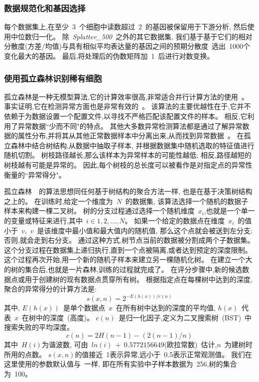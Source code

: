 \subsubsection{数据规范化和基因选择}
\label{subsec:datapreprocessing} 
每个数据集上,在至少~3~个细胞中读数超过~2~的基因被保留用于下游分析,
然后使用中位数归一化。
除~\textit{Splatter\_500}~之外的其它数据集,
我们基于基于它们的相对分散度(方差/均值)与具有相似平均表达量的基因之间的预期分散度~\cite{zheng2017massively,macosko2015highly}选出~1000个变化最大的基因。
最后,将处理后的伪数矩阵加~1~后进行对数变换。

\subsubsection{使用孤立森林识别稀有细胞}
\label{subsec:if} 

孤立森林是一种无模型算法,它的计算效率很高,非常适合并行计算方法的使用~\cite{hariri2018batch}。
事实证明,它在检测异常方面也是非常有效的~\cite{susto2017anomaly}。
该算法的主要优越性在于,它并不依赖于为数据设置一个配置文件,以寻找不严格匹配该配置文件的样本。
相反,它利用了异常数据``少而不同"的特点。
其他大多数异常检测算法都是通过了解异常数据的属性分布,并将其从其他正常数据样本中分离出来,从而找到异常数据~\cite{noto2010anomaly,chen2011ordinal,das2016incorporating}。
在孤立森林中结合树结构,从数据中抽取子样本,
并根据数据集中随机选取的特征值进行随机切割。
树枝路径越长,那么该样本为异常样本的可能性越低;
相反,路径越短的树枝越有可能是异常的。
因此,每个树枝的总长度可以被看作是对指定点的异常性衡量的``异常得分"。

孤立森林~\cite{liu2008isolation,liu2012isolation}~的算法思想同任何基于树结构的聚合方法一样,
也是在基于决策树结构之上的。
在训练时,给定一个维度为~$N$~的数据集,
该算法选择一个随机的数据子样本来构建一棵二叉树。
树的分支过程通过选择一个随机维度~$x_i$,也就是一个单一的变量或特征来进行,其中~$i \in {1,2,\ldots,N}$。
如果一个给定的数据点在维度~$x_i$~的值小于~$v$,~$v$~是该维度中最小值和最大值内的随机值,
那么这个点就会被送到左分支;否则,就会走到右分支。
通过这种方式,树节点当前的数据被分割成两个子数据集。
这个分支过程在数据集上递归执行,直到一个点被隔离,或者达到预定的深度限制。
这个过程再次开始,用一个新的随机子样本来建立另一棵随机化树。
在建立一个大的树的集合后,也就是一片森林,训练的过程就完成了。
在评分步骤中,新的候选数据点或用于创建树的现有数据点贯穿所有树。
根据指定点在每棵树中达到的深度,聚合的异常得分的计算方法是:
\begin{equation}
    \label{as}
    s(x,n) = 2^{-E(h(x))/c(n)}
\end{equation}
其中, $E(h(x))$~是单个数据点~$x$~在所有树中达到的深度的平均值, $h(x)$~代表~$x$~在树中的深度~(高度)。 
$c(n)$~是归一化因子,定义为二叉搜索树~(BST)~中搜索失败的平均深度。
\begin{equation}
    \label{lab:as}
    c(n) = 2H(n - 1) - (2(n - 1)/n)
\end{equation}
其中~$H(i)$为谐波数,
可由~$ln(i)~+~0.5772156649$(欧拉常数)~\cite{liu2012isolation}估计,$n$~为建树时所用的点数。
$s(x,n)$的值接近~1表示异常,远小于~0.5表示正常观测值。
我们在这里使用的参数默认值与~\cite{liu2008isolation,liu2012isolation}一样,
即在所有实验中子样本数据为~256,树的集合为~100。

